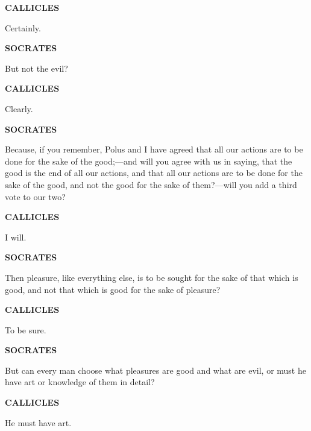 \documentclass[11pt,letter]{article}
\begin{document}
\par \textbf{CALLICLES}
\par   Certainly.

\par \textbf{SOCRATES}
\par   But not the evil?

\par \textbf{CALLICLES}
\par   Clearly.

\par \textbf{SOCRATES}
\par   Because, if you remember, Polus and I have agreed that all our actions are to be done for the sake of the good;—and will you agree with us in saying, that the good is the end of all our actions, and that all our actions are to be done for the sake of the good, and not the good for the sake of them?—will you add a third vote to our two?

\par \textbf{CALLICLES}
\par   I will.

\par \textbf{SOCRATES}
\par   Then pleasure, like everything else, is to be sought for the sake of that which is good, and not that which is good for the sake of pleasure?

\par \textbf{CALLICLES}
\par   To be sure.

\par \textbf{SOCRATES}
\par   But can every man choose what pleasures are good and what are evil, or must he have art or knowledge of them in detail?

\par \textbf{CALLICLES}
\par   He must have art.
\end{document}
